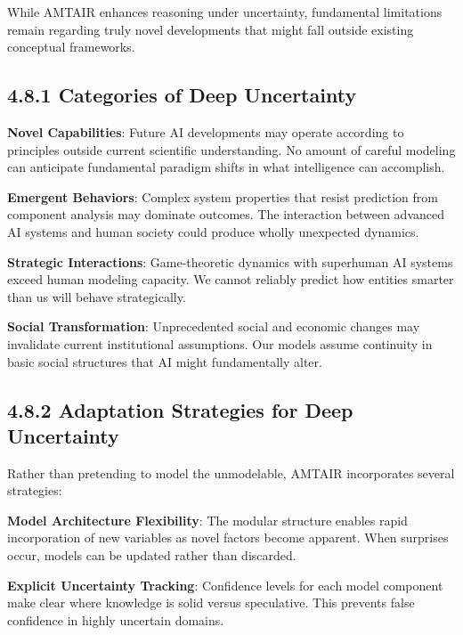 \documentclass[
  11pt,
  letterpaper,
]{book}
\begin{document}

While AMTAIR enhances reasoning under uncertainty, fundamental
limitations remain regarding truly novel developments that might fall
outside existing conceptual frameworks.

\subsection*{4.8.1 Categories of Deep
Uncertainty}\label{sec-uncertainty-categories}

\textbf{Novel Capabilities}: Future AI developments may operate
according to principles outside current scientific understanding. No
amount of careful modeling can anticipate fundamental paradigm shifts in
what intelligence can accomplish.

\textbf{Emergent Behaviors}: Complex system properties that resist
prediction from component analysis may dominate outcomes. The
interaction between advanced AI systems and human society could produce
wholly unexpected dynamics.

\textbf{Strategic Interactions}: Game-theoretic dynamics with superhuman
AI systems exceed human modeling capacity. We cannot reliably predict
how entities smarter than us will behave strategically.

\textbf{Social Transformation}: Unprecedented social and economic
changes may invalidate current institutional assumptions. Our models
assume continuity in basic social structures that AI might fundamentally
alter.

\subsection*{4.8.2 Adaptation Strategies for Deep
Uncertainty}\label{sec-adaptation-strategies}

Rather than pretending to model the unmodelable, AMTAIR incorporates
several strategies:

\textbf{Model Architecture Flexibility}: The modular structure enables
rapid incorporation of new variables as novel factors become apparent.
When surprises occur, models can be updated rather than discarded.

\textbf{Explicit Uncertainty Tracking}: Confidence levels for each model
component make clear where knowledge is solid versus speculative. This
prevents false confidence in highly uncertain domains.
\end{document}
